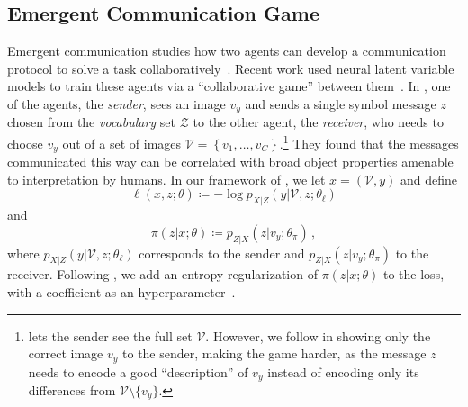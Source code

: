\subsection{Emergent Communication Game}\label{sec:comm}

\noindent Emergent communication studies how two agents can develop a
communication protocol to solve a task
collaboratively~\citep{kirby2002natural}. Recent work used neural
latent variable models to train these agents via a ``collaborative
game'' between
them~\citep{Lazaridou2017,Havrylov2017,
    jorge2016learning, foerster2016learning, sukhbaatar2016learning}. In
\citet{Lazaridou2017}, one of the agents, the \emph{sender}, sees an
image $v_y$ and sends a single symbol message $z$ chosen from the \emph{vocabulary} set
$\mathcal{Z}$ to the other agent, the
\emph{receiver}, who needs to choose $v_y$ out of
a set of images $\mathcal{V} = \left\{ v_1, \dots, v_C
    \right\}$.\footnote{\citet{Lazaridou2017} lets the sender see the
    full set $\mathcal{V}$. However, we follow \citet{Havrylov2017}
    in showing only the correct image $v_y$ to the sender, making the
    game harder, as the message $z$ needs to encode a good
    ``description'' of $v_y$ instead of encoding only
    its differences from $\mathcal{V}\setminus \{v_y\}$.} They found that
the messages communicated this way can be correlated with broad
object properties amenable to interpretation by humans. In our
framework of , we let $x = (\mathcal{V}, y)$ and define
\begin{equation}
    \ell (x, z; \theta) \coloneqq -\log p_{X|Z}(y |\mathcal{V}, z; \theta_\ell)
\end{equation}
and
\begin{equation}
    \pi (z |x; \theta) \coloneqq p_{Z|X}(z |v_y; \theta_\pi)\,,
\end{equation}
where
$p_{X|Z}(y |\mathcal{V}, z; \theta_\ell)$ corresponds to the sender and
$p_{Z|X}(z |v_y; \theta_\pi)$ to the receiver. Following
\citet{Lazaridou2017}, we add an entropy regularization of $\pi (z
    |x; \theta)$ to the loss, with a coefficient as an
hyperparameter~\citep{Mnih2016}.

